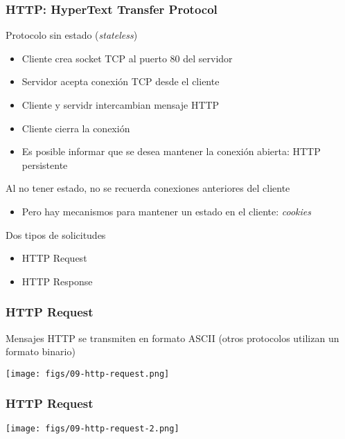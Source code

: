 \documentclass[letter]{beamer}
\begin{document}
\begin{frame}
  \frametitle{HTTP: HyperText Transfer Protocol}

  Protocolo sin estado ({\em stateless})
  \begin{itemize}
    \item Cliente crea socket TCP al puerto 80 del servidor
    \item Servidor acepta conexión TCP desde el cliente
    \item Cliente y servidr intercambian mensaje HTTP
    \item Cliente cierra la conexión
    \item Es posible informar que se desea mantener la conexión abierta: HTTP persistente
  \end{itemize}
  Al no tener estado, no se recuerda conexiones anteriores del cliente
  \begin{itemize}
    \item Pero hay mecanismos para mantener un estado en el cliente: {\em cookies}
  \end{itemize}
  Dos tipos de solicitudes
  \begin{itemize}
    \item HTTP Request
    \item HTTP Response
  \end{itemize}
\end{frame}
\begin{frame}
  \frametitle{HTTP Request}
  
  Mensajes HTTP se transmiten en formato ASCII (otros protocolos utilizan un formato binario)
  
  \begin{center}
    \texttt{[image: figs/09-http-request.png]}
  \end{center}

  
\end{frame}
\begin{frame}
  \frametitle{HTTP Request}
  
  \begin{center}
    \texttt{[image: figs/09-http-request-2.png]}
  \end{center}

  
\end{frame}
\end{document}
